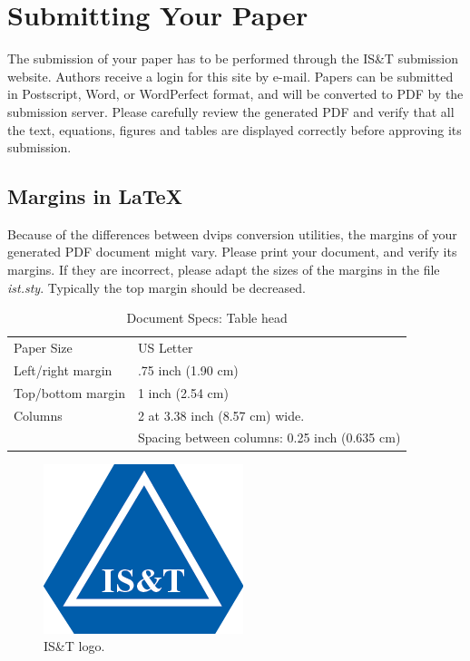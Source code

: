 \documentclass[letterpaper,twocolumn,fleqn]{article}
\begin{document}
\section{Submitting Your Paper}
The submission of your paper has to be performed through the IS\&T
submission website. Authors receive a login for this site by e-mail.
Papers can be submitted in Postscript, Word, or WordPerfect format,
and will be converted to PDF by the submission server. Please
carefully review the generated PDF and verify that all the text,
equations, figures and tables are displayed correctly before approving
its submission.

\subsection{Margins in LaTeX}
Because of the differences between dvips conversion utilities, the
margins of your generated PDF document might vary. Please print
your document, and verify its margins. If they are incorrect, please
adapt the sizes of the margins in the file \emph{ist.sty}. Typically the
top margin should be decreased.

\begin{table}[!h]
\caption{Document Specs: Table head}
\label{tab:specs}
\begin{center}       
\begin{tabular}{p{}p{}} 
Paper Size & US Letter \\
Left/right margin & .75 inch (1.90 cm) \\
Top/bottom margin & 1 inch (2.54 cm) \\
Columns & 2 at 3.38 inch (8.57 cm) wide. \\
 & Spacing between columns: 0.25 inch (0.635 cm)
\end{tabular}
\end{center}
\end{table} 

\begin{figure}[!hb]
  \includegraphics[width=0.3\columnwidth]{logo.png}
  \caption{IS\&T logo.}
  \label{Figure:logo}
\end{figure}
\end{document}
